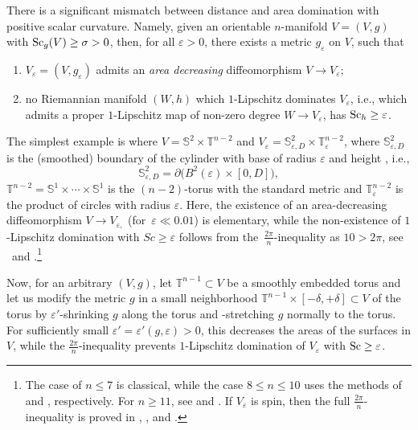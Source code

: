 \documentclass[10pt,a4paper]{amsart}
\numberwithin{equation}{section}
\newcommand{\SSS}{\mathbb{S}}
\newcommand{\TTT}{\mathbb{T}}
\newcommand{\eps}{\varepsilon}
\newcommand{\Sc}{{\rm Sc}}
\newcommand{\myicon}{$\,\,\,\triangleright$}
\begin{document}
 \begin{Remark} There is a significant mismatch between distance and area domination with positive scalar curvature.
Namely, given an orientable $n$-manifold $V=(V,g)$ with $\Sc_g(V) \geq \sigma>0$, then, for all $\varepsilon >0$, there exists a metric $g_{\varepsilon}$ on $V$, such that
\begin{enumerate}[\myicon]\itemsep=0pt
\item $ V_{\varepsilon}=(V,g_{\varepsilon})$ admits an {\it area decreasing} diffeomorphism $V\to V_{\varepsilon }$;
\item no Riemannian manifold $(W,h)$ which $1$-Lipschitz dominates $V_\eps$, i.e., which admits a proper $1$-Lipschitz map of non-zero degree $W \to V_\eps$, has $\Sc_h \geq \varepsilon$.
\end{enumerate}
The simplest example is where $V=\SSS^2\times \TTT^{n-2}$ and $V_\varepsilon =\SSS^2_{\varepsilon, D}\times \TTT_\varepsilon^{n-2}$, where $\SSS^2_{\varepsilon, D}$ is the (smoothed) boundary of the cylinder with base of radius $\varepsilon$ and height , i.e.,
\[
 \SSS^2_{\varepsilon, D}=\partial \big( B^2(\varepsilon)\times [0,D] \big),
 \]
$\TTT^{n-2} = \SSS^1 \times \cdots \times \SSS^1$ is the $(n-2)$-torus with the standard metric and $\TTT_\varepsilon^{n-2}$ is the product of circles with radius $\varepsilon$.
Here, the existence of an area-decreasing diffeomorphism $V\to V_{\varepsilon, }$ (for~${\varepsilon \ll 0.01}$) is elementary, while the non-existence of $1$-Lipschitz domination with $Sc \geq \varepsilon$ follows from the~$\frac {2\pi}{n}$-inequality as $10 > 2\pi$, see \cite[Section 3.6]{Gr21} and \cite[Theorem 2.8 and Proposition~2.21]{Raede22}.\footnote{The case of $n \leq 7$ is classical, while the case $8 \leq n \leq 10$ uses the methods of \cite{Smale} and \cite{CMS}, respectively.
For $n \geq 11$, see \cite[Theorem 4.6]{S-Y2017} and \cite{Loh2018}.
If $V_\eps$ is spin, then the full $\frac {2\pi}{n}$-inequality is proved in \cite[Theorem 1.4]{Ze2019}, \cite[Corollary 1.5]{Ze2020}, \cite[Theorem D]{Ce2020} and \cite[Theorem 1.3]{G-X-Y2020}.}

Now, for an arbitrary $(V,g)$, let $\TTT^{n-1}\subset V $ be a smoothly embedded torus and let us modify the metric $g$ in a small neighborhood $\TTT^{n-1}\times [-\delta, +\delta]\subset V$ of the torus by $\varepsilon'$-shrinking $g$ along the torus and -stretching $g$ normally to the torus.
For sufficiently small $\eps' = \eps'(g, \eps) > 0$, this decreases the areas of the surfaces in $V$, while the $\frac {2\pi}{n}$-inequality prevents $1$-Lipschitz domination of $V_\varepsilon$ with $\Sc \geq \varepsilon$.
\end{Remark}
\end{document}
